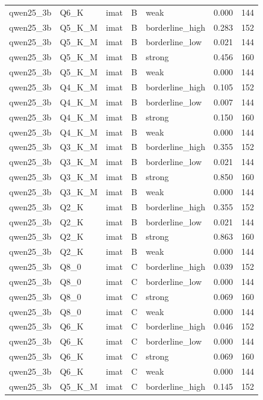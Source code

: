 \begin{tabular}{lllllrr}
qwen25\_3b & Q6\_K & imat & B & weak & 0.000 & 144 \\
qwen25\_3b & Q5\_K\_M & imat & B & borderline\_high & 0.283 & 152 \\
qwen25\_3b & Q5\_K\_M & imat & B & borderline\_low & 0.021 & 144 \\
qwen25\_3b & Q5\_K\_M & imat & B & strong & 0.456 & 160 \\
qwen25\_3b & Q5\_K\_M & imat & B & weak & 0.000 & 144 \\
qwen25\_3b & Q4\_K\_M & imat & B & borderline\_high & 0.105 & 152 \\
qwen25\_3b & Q4\_K\_M & imat & B & borderline\_low & 0.007 & 144 \\
qwen25\_3b & Q4\_K\_M & imat & B & strong & 0.150 & 160 \\
qwen25\_3b & Q4\_K\_M & imat & B & weak & 0.000 & 144 \\
qwen25\_3b & Q3\_K\_M & imat & B & borderline\_high & 0.355 & 152 \\
qwen25\_3b & Q3\_K\_M & imat & B & borderline\_low & 0.021 & 144 \\
qwen25\_3b & Q3\_K\_M & imat & B & strong & 0.850 & 160 \\
qwen25\_3b & Q3\_K\_M & imat & B & weak & 0.000 & 144 \\
qwen25\_3b & Q2\_K & imat & B & borderline\_high & 0.355 & 152 \\
qwen25\_3b & Q2\_K & imat & B & borderline\_low & 0.021 & 144 \\
qwen25\_3b & Q2\_K & imat & B & strong & 0.863 & 160 \\
qwen25\_3b & Q2\_K & imat & B & weak & 0.000 & 144 \\
qwen25\_3b & Q8\_0 & imat & C & borderline\_high & 0.039 & 152 \\
qwen25\_3b & Q8\_0 & imat & C & borderline\_low & 0.000 & 144 \\
qwen25\_3b & Q8\_0 & imat & C & strong & 0.069 & 160 \\
qwen25\_3b & Q8\_0 & imat & C & weak & 0.000 & 144 \\
qwen25\_3b & Q6\_K & imat & C & borderline\_high & 0.046 & 152 \\
qwen25\_3b & Q6\_K & imat & C & borderline\_low & 0.000 & 144 \\
qwen25\_3b & Q6\_K & imat & C & strong & 0.069 & 160 \\
qwen25\_3b & Q6\_K & imat & C & weak & 0.000 & 144 \\
qwen25\_3b & Q5\_K\_M & imat & C & borderline\_high & 0.145 & 152 \\

\end{tabular}
